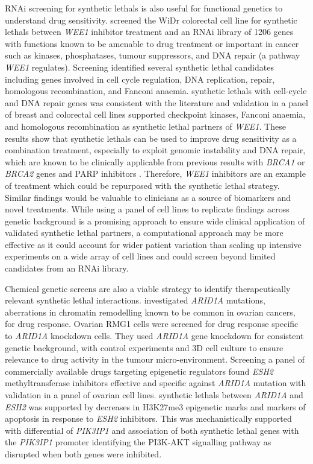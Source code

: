 \gls{RNAi} screening for \glspl{synthetic lethal} is also useful for functional genetics to understand drug sensitivity. \citet{Aarts2015} screened the WiDr colorectal cell line for \glspl{synthetic lethal} between \textit{WEE1} inhibitor treatment and an \gls{RNAi} library of 1206 genes with functions known to be amenable to drug treatment or important in cancer such as kinases, phosphatases, \glspl{tumour suppressor}, and \acrshort{DNA} repair (a pathway \textit{WEE1} regulates). Screening identified several \gls{synthetic lethal} candidates including genes involved in cell cycle regulation, \acrshort{DNA} replication, repair, homologous recombination, and Fanconi anaemia. \Glspl{synthetic lethal} with cell-cycle and \acrshort{DNA} repair genes was consistent with the literature and validation in a panel of breast and colorectal cell lines supported checkpoint kinases, Fanconi anaemia, and homologous recombination as \gls{synthetic lethal} partners of \textit{WEE1}. These results show that \glspl{synthetic lethal} can be used to improve drug sensitivity as a combination treatment, especially to exploit genomic instability and \acrshort{DNA} repair, which are known to be clinically applicable from previous results with \textit{BRCA1} or \textit{BRCA2} genes and \gls{PARP} inhibitors \citep{Lord2014}. Therefore, \textit{WEE1} inhibitors are an example of treatment which could be repurposed with the \gls{synthetic lethal} strategy. Similar findings would be valuable to clinicians as a source of biomarkers and novel \glspl{treatment}. While using a panel of cell lines to replicate findings across genetic background is a promising approach to ensure wide clinical application of validated \gls{synthetic lethal} partners, a computational approach may be more effective as it could account for wider patient variation than scaling up intensive experiments on a wide array of cell lines and could screen beyond limited candidates from an \gls{RNAi} library.  

Chemical genetic screens are also a viable strategy to identify therapeutically relevant \gls{synthetic lethal} interactions. \citet{Bitler2015} investigated \textit{ARID1A} \glspl{mutation}, aberrations in chromatin remodelling known to be common in ovarian cancers, for drug response. Ovarian RMG1 cells were screened for drug response specific to \textit{ARID1A} knockdown cells. They used \textit{ARID1A} gene knockdown for consistent genetic background, with control experiments and 3D cell culture to ensure relevance to drug activity in the tumour micro-environment. Screening a panel of commercially available drugs targeting epigenetic regulators found \textit{ESH2} methyltransferase inhibitors effective and specific against \textit{ARID1A} \gls{mutation} with validation in a panel of ovarian cell lines. \Glspl{synthetic lethal} between \textit{ARID1A} and \textit{ESH2} was supported by decreases in H3K27me3 epigenetic marks and markers of apoptosis in response to \textit{ESH2} inhibitors. This was mechanistically supported with differential  of \textit{PIK3IP1} and association of both \gls{synthetic lethal} genes with the \textit{PIK3IP1} promoter identifying the \gls{PI3K}-AKT signalling pathway as disrupted when both genes were inhibited.
 
